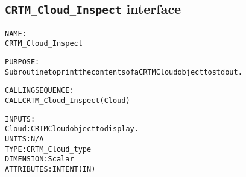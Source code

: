 \subsection{\texttt{CRTM\_Cloud\_Inspect} interface}
  \label{sec:CRTM_Cloud_Inspect_interface}
  \begin{alltt}
 
  NAME:
        CRTM_Cloud_Inspect
 
  PURPOSE:
        Subroutine to print the contents of a CRTM Cloud object to stdout.
 
  CALLING SEQUENCE:
        CALL CRTM_Cloud_Inspect( Cloud )
 
  INPUTS:
        Cloud:         CRTM Cloud object to display.
                       UNITS:      N/A
                       TYPE:       CRTM_Cloud_type
                       DIMENSION:  Scalar
                       ATTRIBUTES: INTENT(IN)
 
  \end{alltt}
